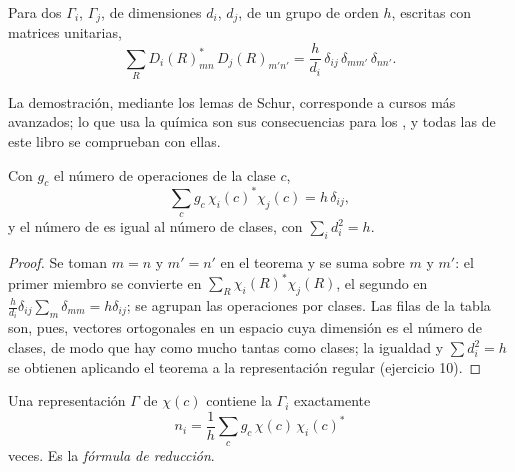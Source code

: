 \begin{theorem}\label{thm:b3:group-theory-applied:great-orthogonality}
Para dos  $\Gamma_i$, $\Gamma_j$, de dimensiones $d_i$,
$d_j$, de un grupo de orden $h$, escritas con matrices unitarias,
\[
\sum_R D_i(R)_{mn}^*\,D_j(R)_{m'n'} = \frac{h}{d_i}\,\delta_{ij}\,\delta_{mm'}\,\delta_{nn'}.
\]
\end{theorem}
\admitted

La demostración, mediante los lemas de Schur, corresponde a cursos más avanzados; lo que
usa la química son sus consecuencias para los , y todas las 
de este libro se comprueban con ellas.

\begin{corollary}\label{cor:b3:group-theory-applied:characters}
Con $g_c$ el número de operaciones de la clase $c$,
\[
\sum_cg_c\,\chi_i(c)^*\chi_j(c) = h\,\delta_{ij},
\]
y el número de  es igual al número de clases,
con $\sum_id_i^2 = h$.
\end{corollary}

\begin{proof}
Se toman $m = n$ y $m' = n'$ en el teorema y se suma sobre $m$ y $m'$: el primer
miembro se convierte en $\sum_R\chi_i(R)^*\chi_j(R)$, el segundo en $\frac{h}{d_i}\delta_{ij}
\sum_{m}\delta_{mm} = h\delta_{ij}$; se agrupan las operaciones por clases. Las filas de
la tabla son, pues, vectores ortogonales en un espacio cuya dimensión es el
número de clases, de modo que hay como mucho tantas  como clases; la igualdad y $\sum d_i^2 = h$ se obtienen aplicando
el teorema a la representación regular (ejercicio 10).
\end{proof}

\begin{theorem}\label{thm:b3:group-theory-applied:reduction}
Una representación $\Gamma$ de  $\chi(c)$ contiene la  $\Gamma_i$ exactamente
\[
n_i = \frac1h\sum_cg_c\,\chi(c)\,\chi_i(c)^*
\]
veces. Es la \emph{fórmula de reducción}.
\end{theorem}

